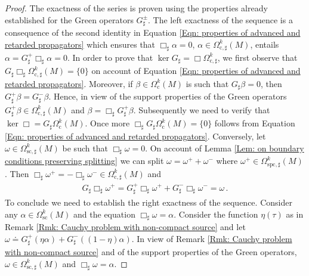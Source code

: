 \begin{proof}
	 The exactness of the series is proven using the properties already established for the Green operators $G^\pm_\sharp$.
	The left exactness of the sequence is a consequence of the second identity in Equation \eqref{Eqn: properties of advanced and retarded propagators} which ensures that $\Box_\sharp\alpha=0$, $\alpha\in\Omega^k_{\mathrm{c},\sharp}(M)$, entails $\alpha=G_\sharp^+\Box_\sharp\alpha=0$.
	In order to prove that $\ker G_\sharp=\Box\Omega^k_{\mathrm{c},\sharp}$, we first observe that $G_\sharp\Box_\sharp\Omega^k_{\mathrm{c},\sharp}(M)=\{0\}$ on account of Equation \eqref{Eqn: properties of advanced and retarded propagators}.
	Moreover, if $\beta\in\Omega^k_{\mathrm{c}}(M)$ is such that $G_\sharp\beta=0$, then $G^+_\sharp\beta=G^-_\sharp\beta$.
	Hence, in view of the support properties of the Green operators $G^+_\sharp\beta\in\Omega^k_{\mathrm{c},\sharp}(M)$ and $\beta=\Box_\sharp G^+_\sharp\beta$.
	Subsequently we need to verify that $\ker\Box=G_\sharp\Omega^k_{\mathrm{c}}(M)$.
	Once more $\Box_\sharp G_\sharp\Omega^k_{\mathrm{c}}(M)=\{0\}$ follows from Equation \eqref{Eqn: properties of advanced and retarded propagators}.
	Conversely, let $\omega\in\Omega^k_{\mathrm{sc},\sharp}(M)$ be such that $\Box_\sharp\omega=0$.
	On account of Lemma \ref{Lem: on boundary conditions preserving splitting} we can split $\omega=\omega^++\omega^-$ where $\omega^+\in\Omega^k_{\mathrm{spc},\sharp}(M)$.
	Then $\Box_\sharp\omega^+=-\Box_\sharp\omega^-\in\Omega^k_{\mathrm{c},\sharp}(M)$ and
	\begin{align*}
	G_\sharp\Box_\sharp\omega^+=
	G_\sharp^+\Box_\sharp\omega^++
	G_\sharp^-\Box_\sharp\omega^-=\omega\,.
	\end{align*}
	To conclude we need to establish the right exactness of the sequence.
	Consider any $\alpha\in\Omega^k_{\mathrm{sc}}(M)$ and the equation $\Box_\sharp\omega=\alpha$.
	Consider the function $\eta(\tau)$ as in Remark \ref{Rmk: Cauchy problem with non-compact source} and let $\omega\doteq G^+_\sharp(\eta\alpha)+G^-_\sharp((1-\eta)\alpha)$.
	In view of Remark \ref{Rmk: Cauchy problem with non-compact source} and of the support properties of the Green operators, $\omega\in\Omega^k_{\mathrm{sc},\sharp}(M)$ and $\Box_\sharp\omega=\alpha$.
\end{proof}

